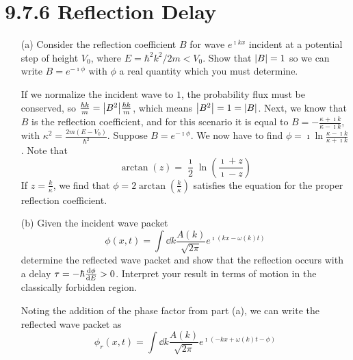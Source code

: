 \documentclass[a4paper,twoside]{article}
\begin{document}
\section*{9.7.6 Reflection Delay}
\begin{itemize}
    \item[(a)] Consider the reflection coefficient $ B $ for wave $ e^{\imath k x} $ incident at a potential step of height $ V_0 $, where $ E = \hbar^2 k^2 / 2m < V_0 $. Show that $ \abs{B} = 1 $ so we can write $ B = e^{-\imath\phi} $ with $ \phi $ a real quantity which you must determine.
        \begin{problem}
            If we normalize the incident wave to $ 1 $, the probability flux must be conserved, so $ \frac{\hbar k}{m} = \abs{B^2} \frac{\hbar k}{m} $, which means $ \abs{B^2} = 1 = \abs{B} $.
            Next, we know that $ B $ is the reflection coefficient, and for this scenario it is equal to $ B = - \frac{\kappa + \imath k}{\kappa - \imath k} $, with $ \kappa^2 = \frac{2m(E-V_0)}{\hbar^2} $. Suppose $ B = e^{-\imath\phi} $. We now have to find $ \phi = \imath\ln{\frac{\kappa - \imath k}{\kappa + \imath k}} $. Note that
            \begin{equation}
                \arctan(z) = \frac{\imath}{2} \ln\left( \frac{\imath + z}{\imath - z} \right)
            \end{equation}
            If $ z = \frac{k}{\kappa} $, we find that $ \phi = 2\arctan\left( \frac{k}{\kappa} \right) $ satisfies the equation for the proper reflection coefficient.
        \end{problem}
    \item[(b)] Given the incident wave packet
        \begin{equation}
            \phi(x,t) = \int \dd{k} \frac{A(k)}{\sqrt{2 \pi}} e^{\imath\left( kx-\omega(k) t \right)}
        \end{equation}
        determine the reflected wave packet and show that the reflection occurs with a delay $ \tau = - \hbar \dv{\phi}{E} > 0 $. Interpret your result in terms of motion in the classically forbidden region.
        \begin{problem}
            Noting the addition of the phase factor from part (a), we can write the reflected wave packet as
            \begin{equation}
                \phi_r(x,t) = \int \dd{k} \frac{A(k)}{\sqrt{2 \pi}} e^{\imath\left( -kx + \omega(k) t - \phi \right)}
            \end{equation}

\end{problem}
\end{itemize}
\end{document}
